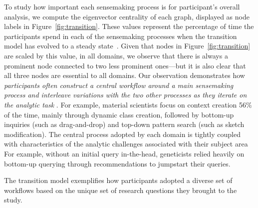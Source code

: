 \par To study how important each sensemaking process
is for participant's overall analysis,
we compute the eigenvector centrality of each graph,
displayed as node labels in Figure~\ref{fig:transition}.
These values represent the percentage of time the participants
spend in each of the sensemaking processes
when the transition model has evolved to a steady state~\cite{pierre2011}.
Given that nodes in Figure~\ref{fig:transition}
are scaled by this value, in all domains,
we observe that there is always a prominent node
connected to two less prominent ones---but it is also clear
that all three nodes are essential to all domains.
Our observation demonstrates how \emph{participants
often construct a central workflow
around a main sensemaking process
and interleave variations with the two other processes
as they iterate on the analytic task}
.
For example, material scientists focus
on context creation 56\% of the time,
mainly through dynamic class creation,
followed by bottom-up inquiries (such as drag-and-drop)
 and top-down pattern search (such as sketch modification).
The central process adopted by each domain
is tightly coupled with characteristics
of the analytic challenges associated with their subject area%
For example, without an initial query in-the-head,
geneticists relied heavily on bottom-up querying
through recommendations to jumpstart their queries.
\par The  transition model exemplifies how participants
adopted a diverse set of workflows
based on the unique set of research questions they brought to the study.
